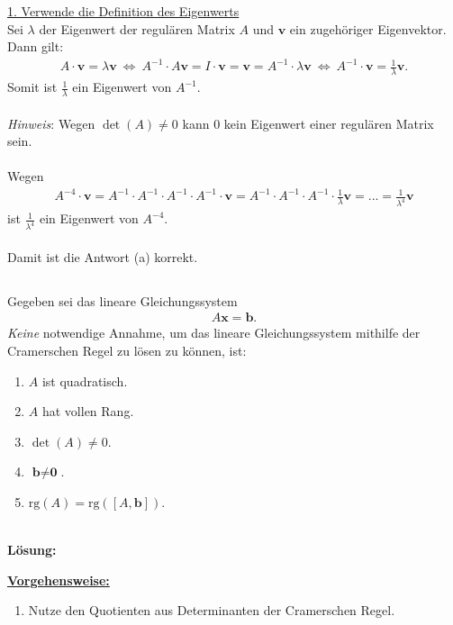 \underline{1. Verwende die Definition des Eigenwerts}\\
Sei $ \lambda  $ der Eigenwert der regulären Matrix $ A $ und $ \textbf{v} $ ein zugehöriger Eigenvektor. Dann gilt:
\begin{align*}
	A \cdot  \textbf{v} = \lambda \textbf{v}
	\ \Leftrightarrow \
	A^{-1} \cdot A \textbf{v} = I \cdot \textbf{v} = \textbf{v} = A^{-1} \cdot \lambda \textbf{v}
	\ \Leftrightarrow \
	A^{-1} \cdot \textbf{v} = \frac{1}{\lambda} \textbf{v}.
\end{align*} 
Somit ist $ \frac{1}{\lambda} $ ein Eigenwert von $ A^{-1} $.\\
\\
\textit{Hinweis}: Wegen $ \det(A) \neq  0 $ kann $ 0 $ kein Eigenwert einer regulären Matrix sein.\\
\\
Wegen
\begin{align*}
	A^{-4} \cdot \textbf{v} 
	= 
	A^{-1} \cdot A^{-1} \cdot A^{-1} \cdot A^{-1} \cdot  \textbf{v}
	=
	A^{-1} \cdot A^{-1} \cdot A^{-1} \cdot \frac{1}{\lambda} \textbf{v}
	=
	...
	=
	\frac{1}{\lambda^4} \textbf{v}  
\end{align*}
ist $ \frac{1}{\lambda^4} $ ein Eigenwert von $ A^{-4} $.\\
\\
Damit ist die Antwort (a) korrekt.


\newpage
\subsection*{}
Gegeben sei das lineare Gleichungssystem
\begin{align*}
	A \textbf{x} = \textbf{b}.
\end{align*}
\textit{Keine} notwendige Annahme, um das lineare Gleichungssystem mithilfe der Cramerschen Regel zu lösen zu können, ist:
\renewcommand{\labelenumi}{(\alph{enumi})}
\begin{enumerate}
	\item 
	$ A $ ist quadratisch.
	\item
	$ A $ hat vollen Rang.
	\item
	$ \det(A) \neq 0$.
	\item
	$ \textbf{b} \neq \textbf{0} $.
	\item
	$ \mathrm{rg}(A) = \mathrm{rg}([A,\textbf{b}])$.
\end{enumerate}
\ \\
\textbf{Lösung:}
\begin{mdframed}
\underline{\textbf{Vorgehensweise:}}
\renewcommand{\labelenumi}{\theenumi.}
\begin{enumerate}
\item Nutze den Quotienten aus Determinanten der Cramerschen Regel.
\end{enumerate}
\end{mdframed}

